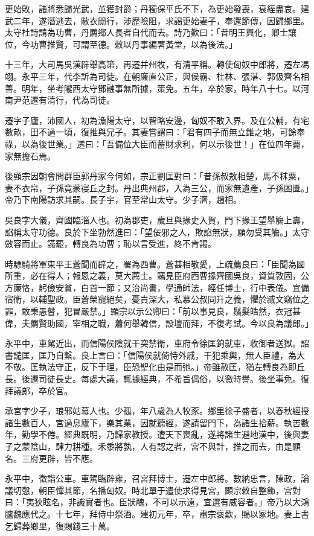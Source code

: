\begin{pinyinscope}
更始敗，諸將悉歸光武，並獲封爵；丹獨保平氏不下，為更始發喪，衰絰盡哀。建武二年，遂潛逃去，敝衣閒行，涉歷險阻，求謁更始妻子，奉還節傳，因歸鄉里。太守杜詩請為功曹，丹薦鄉人長者自代而去。詩乃歎曰：「昔明王興化，卿士讓位，今功曹推賢，可謂至德。敕以丹事編署黃堂，以為後法。」

十三年，大司馬吳漢辟舉高第，再遷并州牧，有清平稱。轉使匈奴中郎將，遷左馮翊。永平三年，代李訢為司徒。在朝廉直公正，與侯霸、杜林、張湛、郭伋齊名相善。明年，坐考隴西太守鄧融事無所據，策免。五年，卒於家，時年八十七。以河南尹范遷有清行，代為司徒。

遷字子廬，沛國人，初為漁陽太守，以智略安邊，匈奴不敢入界。及在公輔，有宅數畝，田不過一頃，復推與兄子。其妻嘗謂曰：「君有四子而無立錐之地，可餘奉祿，以為後世業。」遷曰：「吾備位大臣而蓄財求利，何以示後世！」在位四年薨，家無擔石焉。

後顯宗因朝會問群臣郭丹家今何如，宗正劉匡對曰：「昔孫叔敖相楚，馬不秣粟，妻不衣帛，子孫竟蒙寑丘之封。丹出典州郡，入為三公，而家無遺產，子孫困匱。」帝乃下南陽訪求其嗣。長子宇，官至常山太守。少子濟，趙相。

吳良字大儀，齊國臨淄人也。初為郡吏，歲旦與掾史入賀，門下掾王望舉觴上壽，諂稱太守功德。良於下坐勃然進曰：「望佞邪之人，欺諂無狀，願勿受其觴。」太守斂容而止。讌罷，轉良為功曹；恥以言受進，終不肯謁。

時驃騎將軍東平王蒼聞而辟之，署為西曹。蒼甚相敬愛，上疏薦良曰：「臣聞為國所重，必在得人；報恩之義，莫大薦士。竊見臣府西曹掾齊國吳良，資質敦固，公方廉恪，躬儉安貧，白首一節；又治尚書，學通師法，經任博士，行中表儀。宜備宿衛，以輔聖政。臣蒼榮寵絕矣，憂責深大，私慕公叔同升之義，懼於臧文竊位之罪，敢秉愚瞽，犯冒嚴禁。」顯宗以示公卿曰：「前以事見良，鬚髮皓然，衣冠甚偉，夫薦賢助國，宰相之職，蕭何舉韓信，設壇而拜，不復考試。今以良為議郎。」

永平中，車駕近出，而信陽侯陰就干突禁衛，車府令徐匡鉤就車，收御者送獄。詔書譴匡，匡乃自繫。良上言曰：「信陽侯就倚恃外戚，干犯乘輿，無人臣禮，為大不敬。匡執法守正，反下于理，臣恐聖化由是而弛。」帝雖赦匡，猶左轉良為即丘長。後遷司徒長史。每處大議，輒據經典，不希旨偶俗，以徼時譽。後坐事免。復拜議郎，卒於官。

承宮字少子，琅邪姑幕人也。少孤，年八歲為人牧豕。鄉里徐子盛者，以春秋經授諸生數百人，宮過息廬下，樂其業，因就聽經，遂請留門下，為諸生拾薪。執苦數年，勤學不倦。經典既明，乃歸家教授。遭天下喪亂，遂將諸生避地漢中，後與妻子之蒙陰山，肆力耕種。禾黍將孰，人有認之者，宮不與計，推之而去，由是顯名。三府更辟，皆不應。

永平中，徵詣公車。車駕臨辟雍，召宮拜博士，遷左中郎將。數納忠言，陳政，論議切愨，朝臣憚其節，名播匈奴。時北單于遣使求得見宮，顯宗敕自整飾，宮對曰：「夷狄眩名，非識實者也。臣狀醜，不可以示遠，宜選有威容者。」帝乃以大鴻臚魏應代之。十七年，拜侍中祭酒。建初元年，卒，肅宗褒歎，賜以冢地。妻上書乞歸葬鄉里，復賜錢三十萬。


\end{pinyinscope}

